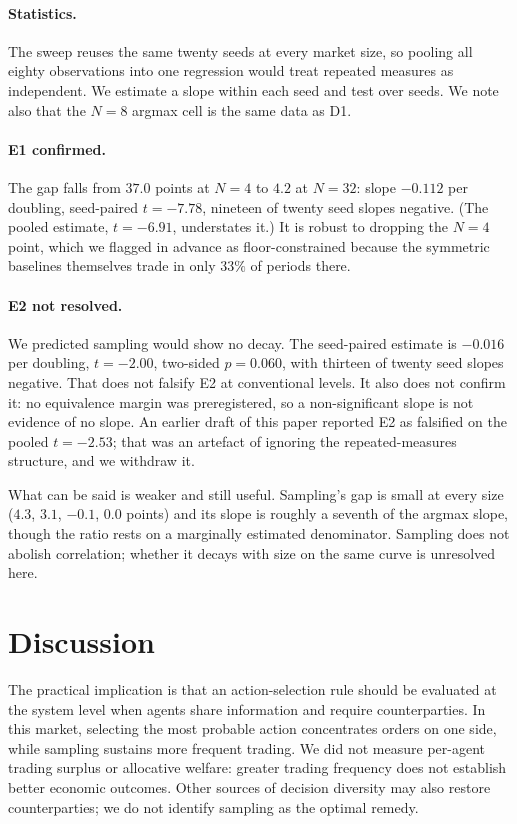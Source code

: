 \documentclass[11pt]{article}
\begin{document}
\paragraph{Statistics.} The sweep reuses the same twenty seeds at every market
size, so pooling all eighty observations into one regression would treat
repeated measures as independent. We estimate a slope within each seed and test
over seeds. We note also that the $N=8$ argmax cell is the same data as D1.

\paragraph{E1 confirmed.} The gap falls from $37.0$ points at $N=4$ to $4.2$ at
$N=32$: slope $-0.112$ per doubling, seed-paired $t=-7.78$, nineteen of twenty
seed slopes negative. (The pooled estimate, $t=-6.91$, understates it.) It is
robust to dropping the $N=4$ point, which we flagged in advance as
floor-constrained because the symmetric baselines themselves trade in only
$33\%$ of periods there.

\paragraph{E2 not resolved.} We predicted sampling would show no decay. The
seed-paired estimate is $-0.016$ per doubling, $t=-2.00$, two-sided $p=0.060$,
with thirteen of twenty seed slopes negative. That does not falsify E2 at
conventional levels. It also does not confirm it: no equivalence margin was
preregistered, so a non-significant slope is not evidence of no slope. An
earlier draft of this paper reported E2 as falsified on the pooled $t=-2.53$;
that was an artefact of ignoring the repeated-measures structure, and we
withdraw it.

What can be said is weaker and still useful. Sampling's gap is small at every
size ($4.3$, $3.1$, $-0.1$, $0.0$ points) and its slope is roughly a seventh of
the argmax slope, though the ratio rests on a marginally estimated denominator.
Sampling does not abolish correlation; whether it decays with size on the same
curve is unresolved here.

\section{Discussion}

The practical implication is that an action-selection rule should be evaluated
at the system level when agents share information and require counterparties.
In this market, selecting the most probable action concentrates orders on one
side, while sampling sustains more frequent trading. We did not measure
per-agent trading surplus or allocative welfare: greater trading frequency
does not establish better economic outcomes. Other sources of decision
diversity may also restore counterparties; we do not identify sampling as the
optimal remedy.
\end{document}
